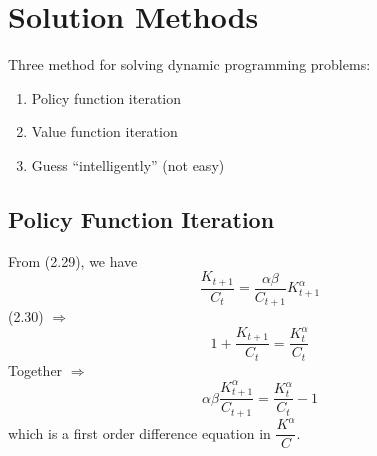 \documentclass[twoside]{article}
\begin{document}
\section{Solution Methods}
Three method for solving dynamic programming problems:
\begin{enumerate}
    \item Policy function iteration
    \item Value function iteration
    \item Guess ``intelligently'' (not easy)
\end{enumerate}
\subsection{Policy Function Iteration}
From (2.29), we have \begin{equation}
    \frac{K_{t+1}}{C_t} = \frac{\alpha \beta}{C_{t+1}}K_{t+1}^\alpha
\end{equation}
(2.30) $\Longrightarrow$
\begin{equation}
    1+ \frac{K_{t+1}}{C_t} = \frac{K_t^\alpha}{C_t}
\end{equation}
Together $\Longrightarrow$
\begin{equation}
    \alpha \beta \frac{K_{t+1}^\alpha}{C_{t+1}} = \frac{K_t^\alpha}{C_t} - 1
\end{equation}
which is a first order difference equation in $\dfrac{K^\alpha}{C}$.
\end{document}
